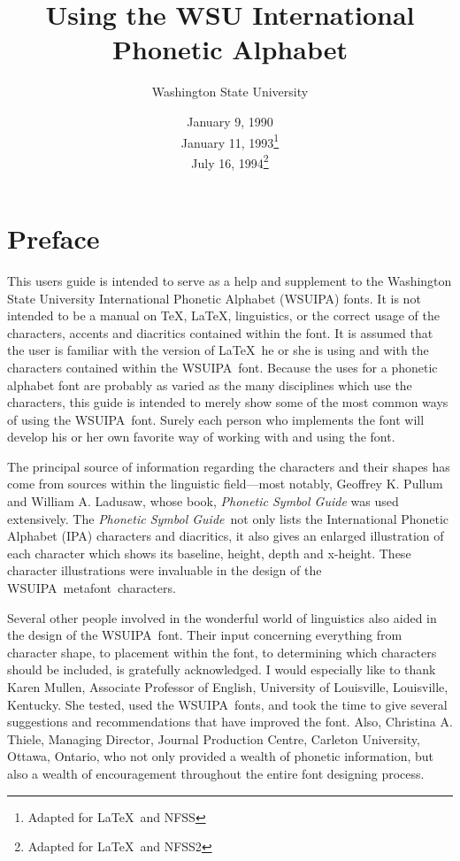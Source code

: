 \documentclass[12pt]{article}
\newcommand{\MF}{{\rm\sc{}metafont}}
\newcommand{\wsu}{{\small\rm WSUIPA}}
\newcommand{\PL}{{\em Phonetic Symbol Guide}}
\begin{document}
\title{Using the WSU International Phonetic Alphabet}
\author{Washington State University}
\date{
  January 9, 1990   \\
  January 11, 1993\footnote{Adapted for \LaTeX\ and NFSS} \\
  July 16, 1994\footnote{Adapted for \LaTeX\ and NFSS2}
}
\maketitle

\section{Preface}

This users guide is intended to serve as a help and supplement to the
Washington State University International Phonetic Alphabet (\wsu)
fonts. It is not intended to be a manual on \TeX, \LaTeX, linguistics,
or the correct usage of the characters, accents and diacritics
contained within the font. It is assumed that the user is familiar
with the version of \LaTeX\ he or she is using and with the characters
contained within the \wsu\ font. Because the uses for a phonetic
alphabet font are probably as varied as the many disciplines which use
the characters, this guide is intended to merely show some of the most
common ways of using the \wsu\ font. Surely each person who implements
the font will develop his or her own favorite way of working with and
using the font.

The principal source of information regarding the characters and their
shapes has come from sources within the linguistic field---most
notably, Geoffrey K. Pullum and William A. Ladusaw, whose book, {\em
Phonetic Symbol Guide} was used extensively. The \PL\ not only lists
the International Phonetic Alphabet (IPA) characters and diacritics,
it also gives an enlarged illustration of each character which shows
its baseline, height, depth and x-height. These character
illustrations were invaluable in the design of the \wsu\ \MF\
characters.

Several other people involved in the wonderful world of linguistics
also aided in the design of the \wsu\ font. Their input concerning
everything from character shape, to placement within the font, to
determining which characters should be included, is gratefully
acknowledged. I would especially like to thank Karen Mullen, Associate
Professor of English, University of Louisville, Louisville, Kentucky.
She tested, used the \wsu\ fonts, and took the time to give several
suggestions and recommendations that have improved the font. Also,
Christina A. Thiele, Managing Director, Journal Production Centre,
Carleton University, Ottawa, Ontario, who not only provided a wealth
of phonetic information, but also a wealth of encouragement throughout
the entire font designing process.
\end{document}
